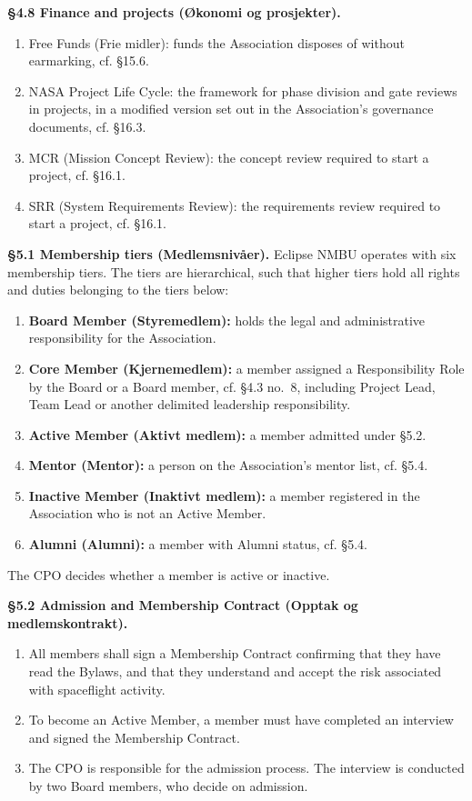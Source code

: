 \documentclass{../../../Common/Latex/Templates/rapport}
\begin{document}
\textbf{\S 4.8 Finance and projects (Økonomi og prosjekter).}
\begin{enumerate}
  \item Free Funds (Frie midler): funds the Association disposes of without earmarking, cf. \S15.6.
  \item NASA Project Life Cycle: the framework for phase division and gate reviews in projects, in a modified version set out in the Association's governance documents, cf. \S16.3.
  \item MCR (Mission Concept Review): the concept review required to start a project, cf. \S16.1.
  \item SRR (System Requirements Review): the requirements review required to start a project, cf. \S16.1.
\end{enumerate}


\textbf{\S 5.1 Membership tiers (Medlemsnivåer).} Eclipse NMBU operates with six membership tiers. The tiers are hierarchical, such that higher tiers hold all rights and duties belonging to the tiers below:
\begin{enumerate}
  \item \textbf{Board Member (Styremedlem):} holds the legal and administrative responsibility for the Association.
  \item \textbf{Core Member (Kjernemedlem):} a member assigned a Responsibility Role by the Board or a Board member, cf. \S4.3 no.\ 8, including Project Lead, Team Lead or another delimited leadership responsibility.
  \item \textbf{Active Member (Aktivt medlem):} a member admitted under \S5.2.
  \item \textbf{Mentor (Mentor):} a person on the Association's mentor list, cf. \S5.4.
  \item \textbf{Inactive Member (Inaktivt medlem):} a member registered in the Association who is not an Active Member.
  \item \textbf{Alumni (Alumni):} a member with Alumni status, cf. \S5.4.
\end{enumerate}
The CPO decides whether a member is active or inactive.

\textbf{\S 5.2 Admission and Membership Contract (Opptak og medlemskontrakt).}
\begin{enumerate}
  \item All members shall sign a Membership Contract confirming that they have read the Bylaws, and that they understand and accept the risk associated with spaceflight activity.
  \item To become an Active Member, a member must have completed an interview and signed the Membership Contract.
  \item The CPO is responsible for the admission process. The interview is conducted by two Board members, who decide on admission.
\end{enumerate}
\end{document}
